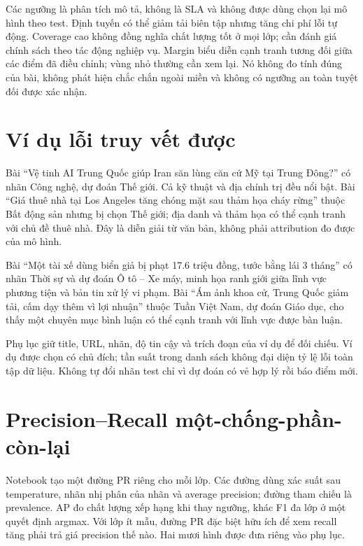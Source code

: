 Các ngưỡng là phân tích mô tả, không là SLA và không được dùng chọn lại mô hình theo test. Định tuyến có thể giảm tải biên tập nhưng tăng chi phí lỗi tự động. Coverage cao không đồng nghĩa chất lượng tốt ở mọi lớp; cần đánh giá chính sách theo tác động nghiệp vụ.
Margin biểu diễn cạnh tranh tương đối giữa các điểm đã điều chỉnh; vùng nhỏ thường cần xem lại. Nó không đo tính đúng của bài, không phát hiện chắc chắn ngoài miền và không có ngưỡng an toàn tuyệt đối được xác nhận.

\section{Ví dụ lỗi truy vết được}
Bài ``Vệ tinh AI Trung Quốc giúp Iran săn lùng căn cứ Mỹ tại Trung Đông?'' có nhãn Công nghệ, dự đoán Thế giới. Cả kỹ thuật và địa chính trị đều nổi bật. Bài ``Giá thuê nhà tại Los Angeles tăng chóng mặt sau thảm họa cháy rừng'' thuộc Bất động sản nhưng bị chọn Thế giới; địa danh và thảm họa có thể cạnh tranh với chủ đề thuê nhà. Đây là diễn giải từ văn bản, không phải attribution đo được của mô hình.

Bài ``Một tài xế dùng biển giả bị phạt 17.6 triệu đồng, tước bằng lái 3 tháng'' có nhãn Thời sự và dự đoán Ô tô -- Xe máy, minh họa ranh giới giữa lĩnh vực phương tiện và bản tin xử lý vi phạm. Bài ``Ám ảnh khoa cử, Trung Quốc giảm tải, cấm dạy thêm vì lợi nhuận'' thuộc Tuần Việt Nam, dự đoán Giáo dục, cho thấy một chuyên mục bình luận có thể cạnh tranh với lĩnh vực được bàn luận.

Phụ lục giữ title, URL, nhãn, độ tin cậy và trích đoạn của ví dụ để đối chiếu. Ví dụ được chọn có chủ đích; tần suất trong danh sách không đại diện tỷ lệ lỗi toàn tập dữ liệu. Không tự đổi nhãn test chỉ vì dự đoán có vẻ hợp lý rồi báo điểm mới.

\section{Precision--Recall một-chống-phần-còn-lại}
Notebook tạo một đường PR riêng cho mỗi lớp. Các đường dùng xác suất sau temperature, nhãn nhị phân của nhãn và average precision; đường tham chiếu là prevalence. AP đo chất lượng xếp hạng khi thay ngưỡng, khác F1 đa lớp ở một quyết định argmax. Với lớp ít mẫu, đường PR đặc biệt hữu ích để xem recall tăng phải trả giá precision thế nào. Hai mươi hình được đưa riêng vào phụ lục.

